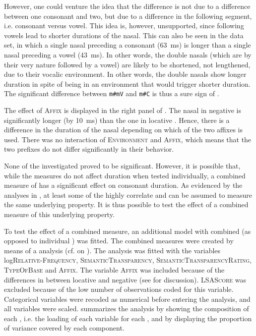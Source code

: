 However, one could venture the idea that the difference is not due to a difference between one consonant and two, but due to a difference in the following segment, i.e. consonant versus vowel. This idea is, however, unsupported, since following vowels lead to shorter durations of the nasal. This can also be seen in the data set, in which a single nasal preceding a consonant (63~ms) is longer than a single nasal preceding a vowel (43~ms). In other words, the double nasals (which are by their very nature followed by a vowel) are likely to be shortened, not lengthened, due to their vocalic environment. In other words, the double nasals show longer duration in spite of being in an environment that would trigger shorter duration. The significant difference between \texttt{m\#mV}  and \texttt{m\#C} is thus a sure sign of .



The effect of \textsc{Affix} is displayed  in the right panel of . The nasal in negative  is significantly longer (by 10~ms) than the one in locative . Hence, there is a difference in the duration of the nasal depending on which of the two affixes is used. There was no interaction of \textsc{Environment} and \textsc{Affix}, which means that the two prefixes do not differ significantly in their  behavior.


None of the investigated  proved to be significant. However, it is possible that, while the measures do not affect duration when tested individually, a combined measure of  has a significant effect on consonant duration. As evidenced by the  analyses in , at least some of the  highly correlate and can be assumed to measure the same underlying property. It is thus possible to test the effect of a combined measure of this underlying property. 

To test the effect of a combined  measure, an additional model with combined  (as opposed to individual ) was fitted. The combined measures were created by means of a  analysis (cf.  on ). 
The  analysis was fitted with the variables log\textsc{Relative-Frequency}, \textsc{SemanticTransparency}, \textsc{SemanticTransparencyRating}, \textsc{TypeOfBase} and \textsc{Affix}. The variable \textsc{Affix} was included because of the differences in  between locative and negative  (see  for discussion). \textsc{LSAScore} was excluded because of the low number of observations coded for this variable. Categorical variables were recoded as numerical before entering the analysis, and all variables were scaled.
 summarizes the analysis by showing the composition of each , i.e. the loading of each variable for each , and by displaying the proportion of variance covered by each component. 


